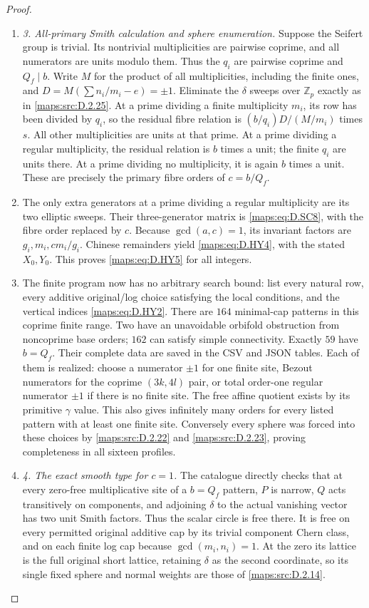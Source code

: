 \begin{proof}
\begin{enumerate}[label=\arabic*.,leftmargin=*]
\item \emph{3. All-primary Smith calculation and sphere enumeration.}
Suppose the Seifert group is trivial. Its nontrivial multiplicities
are pairwise coprime, and all numerators are units modulo them.
Thus the $q_i$ are pairwise coprime and $Q_f\mid b$.
Write $M$ for the product of all multiplicities, including the
finite ones, and $D=M(\sum n_i/m_i-e)=\pm1$.
Eliminate the $\delta$ sweeps over $\mathbb Z_p$ exactly as in
\ref{maps:src:D.2.25}. At a prime dividing a finite multiplicity $m_i$, its row
has been divided by $q_i$, so the residual fibre relation is
$(b/q_i)D/(M/m_i)$ times $s$. All other multiplicities are units
at that prime. At a prime dividing a regular multiplicity, the
residual relation is $b$ times a unit; the finite $q_i$ are units
there. At a prime dividing no multiplicity, it is again $b$ times
a unit. These are precisely the primary fibre orders of
$c=b/Q_f$.

\item The only extra generators at a prime dividing a regular multiplicity
are its two elliptic sweeps. Their three-generator matrix is
\eqref{maps:eq:D.SC8}, with the fibre order replaced by $c$. Because
$\gcd(a,c)=1$, its invariant factors are
$g_i,m_i,cm_i/g_i$. Chinese remainders yield \eqref{maps:eq:D.HY4}, with the
stated $X_0,Y_0$. This proves \eqref{maps:eq:D.HY5} for all integers.

\item The finite program now has no arbitrary search bound: list every
natural row, every additive original/log choice satisfying the
local conditions, and the vertical indices \eqref{maps:eq:D.HY2}. There are
$164$ minimal-cap patterns in this coprime finite range. Two have
an unavoidable orbifold obstruction from noncoprime base orders;
$162$ can satisfy simple connectivity. Exactly $59$ have $b=Q_f$.
Their complete data are saved in the CSV and JSON tables. Each
of them is realized: choose a numerator $\pm1$ for one finite
site, Bezout numerators for the coprime $(3k,4l)$ pair, or total
order-one regular numerator $\pm1$ if there is no finite site.
The free affine quotient exists by its primitive $\gamma$ value.
This also gives infinitely many orders for every listed pattern
with at least one finite site. Conversely every sphere was forced
into these choices by \ref{maps:src:D.2.22} and \ref{maps:src:D.2.23}, proving completeness in
all sixteen profiles.

\item \emph{4. The exact smooth type for $c=1$.}
The catalogue directly checks that at every zero-free multiplicative
site of a $b=Q_f$ pattern, $P$ is narrow, $Q$ acts transitively on
components, and adjoining $\delta$ to the actual vanishing vector
has two unit Smith factors. Thus the scalar circle is free there.
It is free on every permitted original additive cap by its trivial
component Chern class, and on each finite log cap because
$\gcd(m_i,n_i)=1$. At the zero its lattice is the full original
short lattice, retaining $\delta$ as the second coordinate, so its
single fixed sphere and normal weights are those of \ref{maps:src:D.2.14}.


\end{enumerate}
\end{proof}
